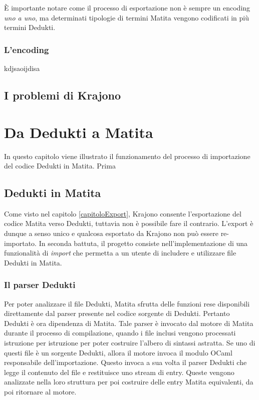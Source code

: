 \documentclass[12pt,a4paper]{mimosis}
\begin{document}
È importante notare come il processo di esportazione non è sempre un encoding
\textit{uno a uno}, ma determinati tipologie di termini Matita vengono codificati
in più termini Dedukti.

\subsection{L'encoding}\label{sottoSezioneEncoding}
kdjsaoijdisa

\section{I problemi di Krajono}\label{sezioneProblemiKrajono}


\chapter{Da Dedukti a Matita}
In questo capitolo viene illustrato il funzionamento del processo di importazione
del codice Dedukti in Matita. Prima %


\section{Dedukti in Matita}
Come visto nel capitolo \ref{capitoloExport}, Krajono consente l'esportazione del codice
Matita verso Dedukti, tuttavia non è possibile fare il contrario. L'export è dunque 
a senso unico e qualcosa esportato da Krajono non può essere re-importato. In seconda
battuta, il progetto consiste nell'implementazione di una funzionalità di \textit{import}
che permetta a un utente di includere e utilizzare file Dedukti in Matita.

\subsection{Il parser Dedukti}\label{sottoSezioneParserDedukti}
Per poter analizzare il file Dedukti, Matita sfrutta delle funzioni rese disponibili
direttamente dal parser presente nel codice sorgente di Dedukti. Pertanto Dedukti è
ora dipendenza di Matita. Tale parser è invocato dal motore di Matita durante il processo
di compilazione, quando i file inclusi vengono processati istruzione per istruzione 
per poter costruire l'albero di sintassi astratta. Se uno di questi file è un sorgente
Dedukti, allora il motore invoca il modulo OCaml responsabile dell'importazione. 
Questo invoca a sua volta il parser Dedukti che legge il contenuto del file e restituisce
uno stream di entry. Queste vengono analizzate nella loro struttura per poi costruire delle
entry Matita equivalenti, da poi ritornare al motore.
\end{document}
